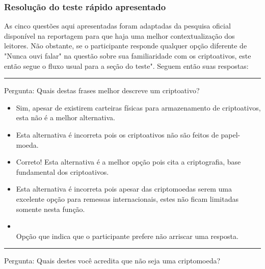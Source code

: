 \subsubsection{Resolução do teste rápido apresentado} \label{pesquisa_quest}

As cinco questões aqui apresentadas foram adaptadas da pesquisa oficial disponível na reportagem para que haja uma melhor contextualização dos leitores. Não obstante, se o participante responde qualquer opção diferente de "Nunca ouvi falar" na questão sobre sua familiaridade com os criptoativos, este então segue o fluxo usual para a seção do teste". Seguem então suas respostas:



\rule{\linewidth}{0.5mm}
Pergunta: Quais destas frases melhor descreve um criptoativo?
\begin{itemize}
	\item {}
	
	Sim, apesar de existirem carteiras físicas para armazenamento de criptoativos, esta não é a melhor alternativa.
	
	\item {}
	
	Esta alternativa é incorreta pois os criptoativos não são feitos de papel-moeda. 
	
	\item {}
	
	Correto! Esta alternativa é a melhor opção pois cita a criptografia, base fundamental dos criptoativos.
	
	\item {}
	
	Esta alternativa é incorreta pois apesar das criptomoedas serem uma excelente opção para remessas internacionais, estes não ficam limitadas somente nesta função. 
		
	\item {}\\ Opção que indica que o participante prefere não arriscar uma resposta.

\end{itemize}

\rule{\linewidth}{0.5mm}

Pergunta: Quais destes você acredita que não seja uma criptomoeda?

